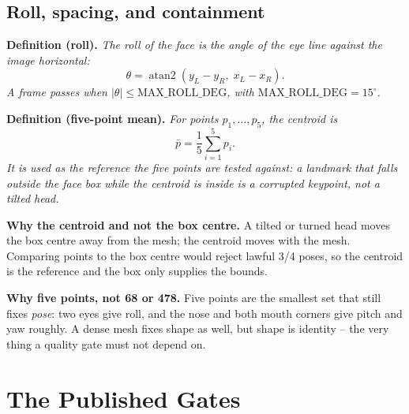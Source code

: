 \documentclass[11pt,a4paper]{article}
\begin{document}
\subsection{Roll, spacing, and containment}

\begin{keybox}
\textbf{Definition (roll).} \emph{  The roll of the face is the angle of the eye line against the image
  horizontal:
  \begin{equation}
    \theta = \operatorname{atan2}\!\left(y_L - y_R,\; x_L - x_R\right).
  \end{equation}
  A frame passes when $|\theta| \le \mathrm{MAX\_ROLL\_DEG}$, with
  $\mathrm{MAX\_ROLL\_DEG}=15^{\circ}$.
}\end{keybox}

\begin{keybox}
\textbf{Definition (five-point mean).} \emph{  For points $p_1,\dots,p_5$, the centroid is
  \begin{equation}
    \bar{p} = \frac{1}{5}\sum_{i=1}^{5} p_i .
  \end{equation}
  It is used as the reference the five points are tested against: a
  landmark that falls outside the face box while the centroid is inside
  is a corrupted keypoint, not a tilted head.
}\end{keybox}

\begin{keybox}
\textbf{Why the centroid and not the box centre.}
  A tilted or turned head moves the box centre away from the mesh; the
  centroid moves with the mesh. Comparing points to the box centre would
  reject lawful 3/4 poses, so the centroid is the reference and the box
  only supplies the bounds.
\end{keybox}

\begin{keybox}
\textbf{Why five points, not 68 or 478.}
  Five points are the smallest set that still fixes \emph{pose}: two eyes
  give roll, and the nose and both mouth corners give pitch and yaw
  roughly. A dense mesh fixes shape as well, but shape is identity -- the
  very thing a quality gate must not depend on.
\end{keybox}

\section{The Published Gates}
\label{sec:gates}
\end{document}
